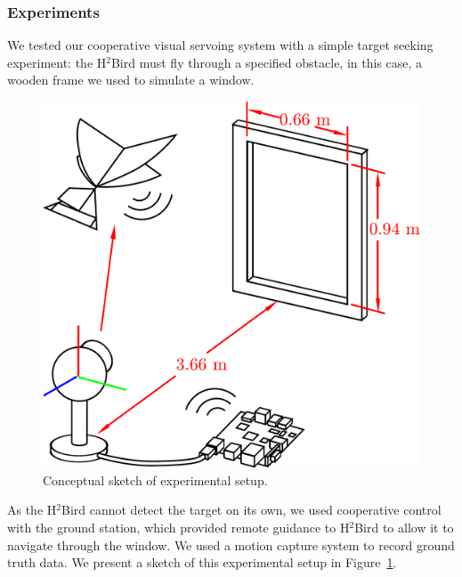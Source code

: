 \documentclass{aamas2013}
\begin{document}
\subsubsection{Experiments}
\label{sec:experiments_verification}

We tested our cooperative visual servoing system with a simple target seeking
experiment: the H$^2$Bird must fly through a specified obstacle, in this 
case, a wooden frame we used to simulate a window.

\begin{figure}[tb]
\centering
\includegraphics[width=0.9\linewidth]{figures/experiment_cartoon.pdf}
\caption{Conceptual sketch of experimental setup.}
\label{fig:experiment_cartoon}
\end{figure}

As the H$^2$Bird cannot detect the target on its own, we used cooperative 
control with the ground station, which provided remote guidance to 
H$^2$Bird to allow it to navigate through the window. We used a motion capture 
system to record ground truth data. We present a sketch of this experimental 
setup in Figure~\ref{fig:experiment_cartoon}.
\end{document}

